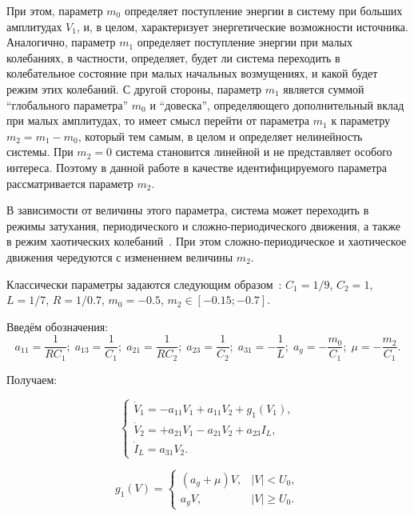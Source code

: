 При этом, параметр \(m_0\) определяет поступление энергии в систему
при больших амплитудах \(V_1\), и, в целом, характеризует
энергетические возможности источника.
Аналогично, параметр \(m_1\) определяет поступление энергии
при малых колебаниях, в частности, определяет, будет ли
система переходить в колебательное состояние при малых начальных
возмущениях, и какой будет режим этих колебаний.
С другой стороны, параметр \(m_1\) является суммой
``глобального параметра'' \(m_0\) и ``довеска'',
определяющего дополнительный вклад при малых амплитудах,
то имеет смысл перейти от параметра \(m_1\) к параметру
\( m_2 = m_1 - m_0 \), который тем самым, в целом
и определяет нелинейность
системы. При \( m_2 = 0 \) система становится линейной
и не представляет особого интереса. Поэтому
в данной работе в качестве
идентифицируемого параметра рассматривается параметр \(m_2\).

В зависимости от величины этого параметра,
система может переходить в режимы затухания,
периодического и сложно-периодического движения, а также в режим
хаотических колебаний~\cite{anisch_nonlin_eff,magni_new_meth}. При этом сложно-периодическое и хаотическое
движения чередуются с изменением величины \(m_2\).


Классически параметры задаются следующим образом~\cite{buga_chua}:
$C_1 = 1/9$, $C_2 = 1$, $L= 1/7$, $R = 1/0.7$, $m_0=-0.5$, $ m_2 \in [ -0.15; -0.7 ] $.

Введём обозначения:
\[
  a_{11} = \frac{1}{R C_1}; \;
  a_{13} = \frac{1}{C_1}; \;
  a_{21} = \frac{1}{R C_2}; \;
  a_{23} = \frac{1}{C_2}; \;
  a_{31} = -\frac{1}{L}; \;
  a_g = - \frac{m_0}{C_1}; \;
  \mu = - \frac{m_2}{C_1}.
\]

\noindent
Получаем:

\begin{equation}
\begin{cases}
  \dot{V}_1  = -a_{11} V_1 + a_{11}  V_2  + g_1(V_1) , \\
  \dot{V}_2  = +a_{21} V_1 - a_{21}  V_2  + a_{23} I_L    , \\
  \dot{I}_L  =  a_{31} V_2.
\end{cases}
\label{atu:eq:chua2}
\end{equation}


\begin{equation}
g_1(V) =
\begin{cases}
  ( a_g + \mu ) V , & |V| <   U_0, \\
  a_g V           , & |V| \ge U_0.
\end{cases}
\label{atu:eq:diodchua2}
\end{equation}

